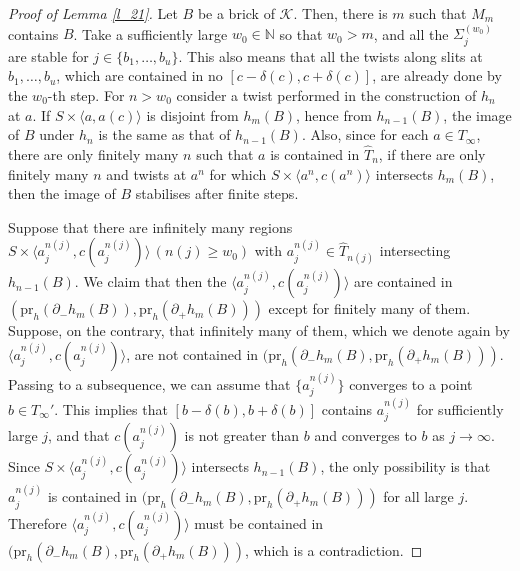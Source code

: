 \documentclass{amsart}
\theoremstyle{definition}
\numberwithin{figure}{section}
\numberwithin{equation}{section}
\newcommand{\blackboard}[1]{\ensuremath{\mathbb{#1}}}
\newcommand{\naturals}{\blackboard{N}}
\newcommand{\pr}{\mathrm{pr}}
\def\nn{\naturals}
\def\ck{\mathcal{K}}
\def\Sg{\Sigma}
\def\Sg{\Sigma}
\begin{document}
\begin{proof}[Proof of Lemma \ref{l_21}]
\sloppy
Let $B$ be a brick of $\ck$.
Then, there is $m$ such that $M_m$ contains $B$.
Take a sufficiently large $w_0\in \nn$  so that  $w_0 >m$, and all the $\Sg_{j}^{(w_0)}$ are stable for $j\in\{b_1,\dots,b_u\}$.
This also means that all the twists along slits at $b_1,\dots,b_u$,  which are contained in no $[c-\delta(c), c+\delta(c)]$, are already done by the $w_0$-th step.
For  $n > w_0$ consider a twist  performed in the construction of $h_n$ at $a$.
If $S \times \langle a, a(c) \rangle$ is disjoint from $h_m(B)$, hence from   $h_{n-1}(B)$, the image of $B$ under $h_n$ is the same as that of $h_{n-1}(B)$.
Also, since for each $a \in T_\infty$, there are only finitely many $n$ such that $a$ is contained in $\hat T_n$, if there are only finitely many $n$ and twists at $a^n$ for  which $S \times \langle a^n, c(a^n)\rangle$ intersects $h_m(B)$, then the image of $B$ stabilises after finite steps.

Suppose that there are infinitely many  regions $S \times \langle a_j^{n(j)}, c(a_j^{n(j)})\rangle\, (n(j) \geq w_0)$ with $a_j^{n(j)} \in \hat T_{n(j)}$ intersecting $h_{n-1}(B)$.
We claim that then the $\langle a_j^{n(j)}, c(a_j^{n(j)})\rangle $ are contained in $(\pr_h(\partial_- h_m(B)), \pr_h(\partial_+ h_m(B)))$ except for finitely many of them.
Suppose, on the contrary, that  infinitely many of them, which we denote again by $\langle a_j^{n(j)}, c(a_j^{n(j)})\rangle$, are not contained in $(\pr_h(\partial_- h_m(B), \pr_h(\partial_+ h_m(B)))$.
Passing to a subsequence, we can assume that $\{a_j^{n(j)}\}$ converges to a point $b \in T_\infty'$.
This implies that $[b-\delta(b), b+\delta(b)]$ contains $a_j^{n(j)}$ for sufficiently large $j$, and that $c(a_j^{n(j)})$ is not greater than $b$ and converges to $b$ as $j \rightarrow \infty$.
Since $S \times \langle a_j^{n(j)}, c(a_j^{n(j)})\rangle$ intersects $h_{n-1}(B)$, the only possibility is that $a_j^{n(j)}$ is contained in $(\pr_h(\partial_- h_m(B), \pr_h(\partial_+ h_m(B)))$ for all large $j$.
Therefore $\langle a_j^{n(j)}, c(a_j^{n(j)})\rangle$ must be contained in $(\pr_h(\partial_- h_m(B), \pr_h(\partial_+ h_m(B)))$, which is a contradiction.


\end{proof}
\end{document}
